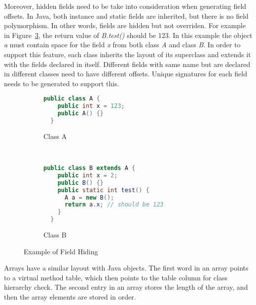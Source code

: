 \documentclass[a4paper, notitlepage]{report}
\begin{document}
Moreover, hidden fields need to be take into consideration when generating field offsets. In Java, both instance and static fields are inherited, but there is no field polymorphism. In other words, fields are hidden but not overriden. For example in Figure~\ref{field_hiding}, the return value of \emph{B.test()} should be 123. In this example the object \emph{a} must contain space for the field \emph{x} from both class \emph{A} and class \emph{B}. In order to support this feature, each class inherits the layout of its superclass and extends it with the fields declared in itself. Different fields with same name but are declared in different classes need to have different offsets. Unique signatures for each field needs to be generated to support this.

\begin{figure}
\centering
\begin{subfigure}{0.4\textwidth}
\begin{lstlisting}[language=Java, frame=single]
  public class A {
    public int x = 123;
    public A() {}
  }
\end{lstlisting}
\caption{Class A}
\label{field_a}
\end{subfigure}
~
\begin{subfigure}{0.4\textwidth}

\begin{lstlisting}[language=Java, frame=single]
  public class B extends A {
    public int x = 2;
    public B() {}
    public static int test() {
      A a = new B();
      return a.x; // should be 123
    }
  }
\end{lstlisting}
\caption{Class B}
\label{field_b}
\end{subfigure}
\caption{Example of Field Hiding}
\label{field_hiding}
\end{figure}

Arrays have a similar layout with Java objects. The first word in an array points to a virtual method table, which then points to the table column for class hierarchy check. The second entry in an array stores the length of the array, and then the array elements are stored in order.
\end{document}
